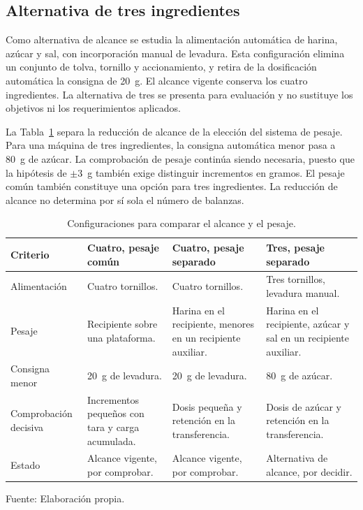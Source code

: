 \subsection{Alternativa de tres ingredientes}

Como alternativa de alcance se estudia la alimentación automática de
harina, azúcar y sal, con incorporación manual de levadura. Esta
configuración elimina un conjunto de tolva, tornillo y accionamiento,
y retira de la dosificación automática la consigna de 20~g. El alcance
vigente conserva los cuatro ingredientes. La alternativa de tres se
presenta para evaluación y no sustituye los objetivos ni los
requerimientos aplicados.

La Tabla~\ref{tab:conceptos_dosificadora} separa la reducción de alcance
de la elección del sistema de pesaje. Para una máquina de tres
ingredientes, la consigna automática menor pasa a 80~g de azúcar.
La comprobación de pesaje continúa siendo necesaria, puesto que la
hipótesis de $\pm3$~g también exige distinguir incrementos en gramos.
El pesaje común también constituye una opción para tres ingredientes.
La reducción de alcance no determina por sí sola el número de balanzas.

\begin{table}[H]
    \centering
    \caption{Configuraciones para comparar el alcance y el pesaje.}
    \label{tab:conceptos_dosificadora}
    \footnotesize
    \renewcommand{\arraystretch}{1.2}
    \begin{tabularx}{\textwidth}{p{}XXX}
        \toprule
        \textbf{Criterio} & \textbf{Cuatro, pesaje común} &
        \textbf{Cuatro, pesaje separado} & \textbf{Tres, pesaje separado} \\
        \midrule
        Alimentación & Cuatro tornillos. & Cuatro tornillos. & Tres tornillos, levadura manual. \\
        Pesaje & Recipiente sobre una plataforma. & Harina en el recipiente, menores en un recipiente auxiliar. & Harina en el recipiente, azúcar y sal en un recipiente auxiliar. \\
        Consigna menor & 20~g de levadura. & 20~g de levadura. & 80~g de azúcar. \\
        Comprobación decisiva & Incrementos pequeños con tara y carga acumulada. & Dosis pequeña y retención en la transferencia. & Dosis de azúcar y retención en la transferencia. \\
        Estado & Alcance vigente, por comprobar. & Alcance vigente, por comprobar. & Alternativa de alcance, por decidir. \\
        \bottomrule
    \end{tabularx}
    \par\smallskip
    Fuente: Elaboración propia.
\end{table}

